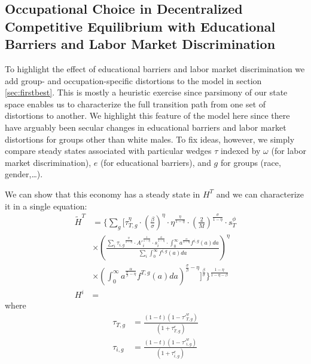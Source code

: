 \documentclass[onehalfspacing,11pt]{article}
\begin{document}
\subsection{Occupational Choice in Decentralized Competitive Equilibrium with Educational Barriers and Labor Market Discrimination}
To highlight the effect of educational barriers and labor market discrimination we add group- and occupation-specific distortions to the model in section \ref{sec:firstbest}. This is mostly a heuristic exercise since parsimony of our state space enables us to characterize the full transition path from one set of distortions to another. We highlight this feature of the model here since there have arguably been secular changes in educational barriers and labor market distortions for groups other than white males. To fix ideas, however, we simply compare steady states associated with particular wedges $\tau$ indexed by $\omega$ (for labor market discrimination), $e$ (for educational barriers), and $g$ for groups (race, gender,\ldots).

We can show that this economy has a steady state in $H^T$ and we can characterize it in a single equation:
\begin{align}
\widetilde{H}^{T} & = \Bigg\{\sum_g \Bigg[ \tau_{T,g}^\eta \cdot \left(\tfrac{\beta}{\sigma}\right)^\eta  \cdot \eta^{\frac{\eta}{1-\eta}} \cdot \left(\tfrac{2}{M}\right)^{\frac{\sigma}{1-\eta}} \cdot s_T^\phi \nonumber\\
& \times \left(\frac{\sum_i {\tau_{i,g}}^{\frac{\eta}{1-\eta}} \cdot {A'}_i^{\frac{1}{1-\eta}} \cdot s_i^{\frac{\phi}{1-\eta}} \cdot \int_0^\infty a^{\frac{\alpha}{1-\eta}} f^{i,g}(a)da }{\sum_i \int_0^\infty f^{i,g}(a)da}\right)^\eta \nonumber\\
& \times \left(\int_0^\infty a^{\frac{\alpha}{\frac{\sigma}{\beta}-\eta}} f^{T,g}(a)da\right)^{\frac{\sigma}{\beta}-\eta} \Bigg]^{\frac{\beta}{\sigma}} \Bigg\}^{\frac{1-\eta}{1-\eta-\beta}}\\
{H}^{i} & = 
\end{align}
where
\begin{align}
\tau_{T,g} & =\frac{(1-t)(1-{\tau'}_{T,g}^w)}{(1+\tau_{T,g}^e)} \nonumber\\
\tau_{i,g} & =\frac{(1-t)(1-{\tau'}_{i,g}^w)}{(1+\tau_{i,g}^e)} \nonumber
\end{align}
\end{document}
